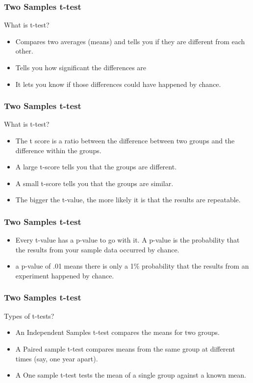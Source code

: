 \begin{frame}[fragile]\frametitle{Two Samples t-test}
What is t-test?
\begin{itemize}
\item Compares two averages (means) and tells you if they are different from each other. 
\item Tells you how significant the differences are
\item It lets you know if those differences could have happened by chance.
\end{itemize}
\end{frame}

\begin{frame}[fragile]\frametitle{Two Samples t-test}
What is t-test?
\begin{itemize}
\item The t score is a ratio between the difference between two groups and the difference within the groups.
\item A large t-score tells you that the groups are different.
\item A small t-score tells you that the groups are similar.
\item  The bigger the t-value, the more likely it is that the results are repeatable.
\end{itemize}
\end{frame}

\begin{frame}[fragile]\frametitle{Two Samples t-test}
\begin{itemize}
\item Every t-value has a p-value to go with it. A p-value is the probability that the results from your sample data occurred by chance. 
\item a p-value of .01 means there is only a 1\% probability that the results from an experiment happened by chance.
\end{itemize}
\end{frame}

\begin{frame}[fragile]\frametitle{Two Samples t-test}
Types of t-tests?
\begin{itemize}
\item  An Independent Samples t-test compares the means for two groups.
\item  A Paired sample t-test compares means from the same group at different times (say, one year apart).
\item  A One sample t-test tests the mean of a single group against a known mean.
\end{itemize}
\end{frame}

